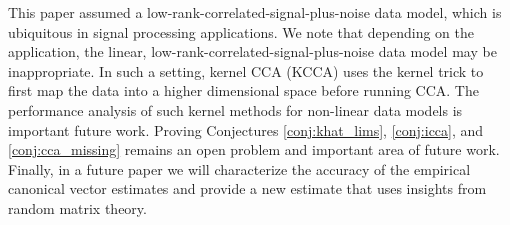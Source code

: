 This paper assumed a low-rank-correlated-signal-plus-noise data model, which is ubiquitous
in signal processing applications.  We note that depending on the application, the linear,
low-rank-correlated-signal-plus-noise data model may be inappropriate. In such a setting,
kernel CCA (KCCA) \cite{welling2011first,yu2007learning} uses the kernel trick to first
map the data into a higher dimensional space before running CCA. The performance analysis
of such kernel methods for non-linear data models is important future
work. Proving Conjectures \ref{conj:khat_lims}, \ref{conj:icca}, and
  \ref{conj:cca_missing} remains an open problem and important area of future
  work. Finally, in a future paper we will characterize the accuracy of the empirical
  canonical vector estimates and provide a new estimate that uses insights from random
  matrix theory.


\appendix


